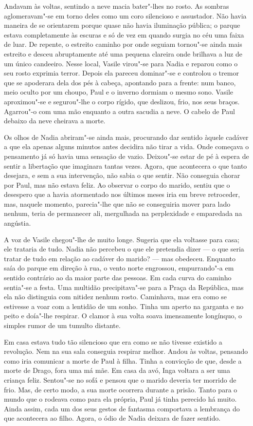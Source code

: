 Andavam às voltas, sentindo a neve macia bater"-lhes no rosto. As sombras
aglomeravam"-se em torno deles como um coro silencioso e assustador. Não
havia maneira de se orientarem porque quase não havia iluminação
pública; o parque estava completamente às escuras e só de vez em quando
surgia no céu uma faixa de luar. De repente, o estreito caminho por onde seguiam tornou"-se ainda mais estreito e desceu
abruptamente até uma pequena clareira onde brilhava a luz de um único
candeeiro. Nesse local, Vasile virou"-se para Nadia e reparou como o seu
rosto exprimia terror. Depois ela pareceu dominar"-se e controlou o
tremor que se apoderara dela dos pés à cabeça, apontando para a
frente: num banco, meio oculto por um choupo, Paul e o inverno dormiam o
mesmo sono. Vasile aproximou"-se e segurou"-lhe o corpo rígido, que
deslizou, frio, nos seus braços. Agarrou"-o com uma mão enquanto a outra
sacudia a neve. O cabelo de Paul debaixo da neve cheirava a morte.

Os olhos de Nadia abriram"-se ainda mais, procurando dar sentido àquele
cadáver a que ela apenas alguns minutos antes decidira não tirar a
vida. Onde começava o pensamento já só havia uma sensação de vazio.
Deixou"-se estar de pé à espera de sentir a libertação que imaginara
tantas vezes. Agora, que acontecera o que tanto desejara, e sem a sua
intervenção, não sabia o que sentir. Não conseguia chorar por Paul,
mas não estava feliz. Ao observar o corpo do marido, sentiu que o
desespero que a havia atormentado nos últimos meses iria em breve
retroceder, mas, naquele momento, parecia"-lhe que não se conseguiria
mover para lado nenhum, teria de permanecer ali, mergulhada na
perplexidade e emparedada na angústia.

A voz de Vasile chegou"-lhe de muito longe. Sugeria que
ela voltasse para casa; ele trataria de tudo. Nadia não percebeu o que
ele pretendia dizer --- o que seria tratar de tudo em relação ao cadáver
do marido? --- mas obedeceu. Enquanto saía do parque em direção à rua, o
vento norte
engrossou, empurrando"-a em sentido contrário ao da maior parte das
pessoas. Em cada curva do caminho sentia"-se a festa. Uma multidão
precipitava"-se para a Praça da República, mas ela não distinguia com
nitidez nenhum rosto. Caminhava, mas era como se estivesse a voar com a
lentidão de um sonho. Tinha um aperto na garganta e no peito e
doía"-lhe respirar. O clamor à sua volta soava imensamente longínquo, o
simples rumor de um tumulto distante.

Em casa estava tudo tão silencioso que era como se não tivesse existido
a revolução. Nem na sua sala conseguia respirar melhor. Andou às voltas,
pensando como iria comunicar a morte de Paul à filha. Tinha a convicção
de que, desde a morte de Drago, fora uma má mãe. Em casa da avó, Inga
voltara a ser uma criança feliz. Sentou"-se no sofá e pensou que o marido
deveria ter morrido de frio. Mas, de certo modo, a sua morte ocorrera
durante a prisão. Tanto para o mundo que o rodeava como para ela
própria, Paul já tinha perecido há muito. Ainda assim, cada um dos seus
gestos de fantasma comportava a lembrança do que acontecera ao filho.
Agora, o ódio de Nadia deixara de fazer sentido.

